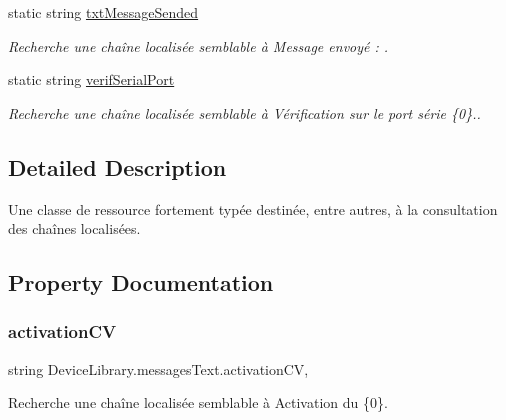 \begin{DoxyCompactItemize}
static string \mbox{\hyperlink{class_device_library_1_1messages_text_aec4481f3887107f375c6a9d5644a3d2e}{txt\+Message\+Sended}}
\begin{DoxyCompactList}\small\item\em Recherche une chaîne localisée semblable à Message envoyé \+: . \end{DoxyCompactList}\item 
static string \mbox{\hyperlink{class_device_library_1_1messages_text_aa2c6c9e22c64621ad6e50951e6233abd}{verif\+Serial\+Port}}
\begin{DoxyCompactList}\small\item\em Recherche une chaîne localisée semblable à Vérification sur le port série \{0\}.. \end{DoxyCompactList}\end{DoxyCompactItemize}


\subsection{Detailed Description}
Une classe de ressource fortement typée destinée, entre autres, à la consultation des chaînes localisées. 



\subsection{Property Documentation}
\mbox{\label{class_device_library_1_1messages_text_a1b8c8f4de98cd13953372dac6cf288da}} 
\subsubsection{\texorpdfstring{activation\+CV}{activationCV}}
{\footnotesize\ttfamily string Device\+Library.\+messages\+Text.\+activation\+CV\hspace{0.3cm}{\ttfamily [static]}, {\ttfamily [get]}}



Recherche une chaîne localisée semblable à Activation du \{0\}. 

